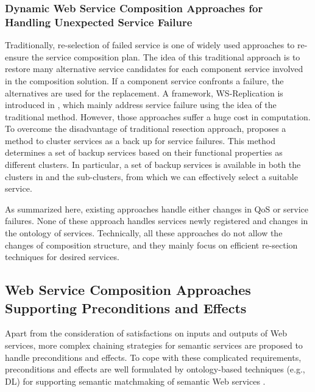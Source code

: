 \subsubsection{Dynamic Web Service Composition Approaches for Handling Unexpected Service Failure}\label{dynamicService}
Traditionally, re-selection of failed service is one of widely used approaches to re-ensure the  service composition plan. The idea of this traditional approach is to restore many alternative service candidates for each component service involved in the composition solution. If a component service confronts a failure, the alternatives are used for the replacement.  A framework, WS-Replication is introduced in \cite{salas2006ws}, which mainly address service failure using the idea of the traditional method. However, those approaches \cite{salas2006ws} suffer a huge cost in computation. To overcome the disadvantage of traditional resection approach,  \cite{wagner2016robust} proposes a method to cluster services as a back up for service failures. This method determines a set of backup services based on their functional properties as different clusters. In particular, a set of backup services is available in both the clusters in and the sub-clusters, from which we can effectively select a suitable service.

As summarized here, existing approaches handle either changes in QoS or service failures. None of these approach handles services newly registered and changes in the ontology of services. Technically, all these approaches do not allow the changes of composition structure, and they mainly focus on efficient re-section techniques for desired services.



\subsection{Web Service Composition Approaches Supporting Preconditions and Effects}\label{Semantic}
Apart from the consideration of satisfactions on inputs and outputs of Web services, more complex chaining strategies for semantic services are proposed to handle preconditions and effects. To cope with these complicated requirements, preconditions and effects are well formulated by ontology-based techniques (e.g., DL) for supporting semantic matchmaking of semantic Web services \cite{wang2014automated}.

